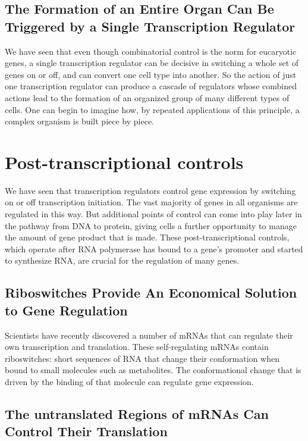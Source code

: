 \subsection{The Formation of an Entire Organ Can Be Triggered by a Single Transcription Regulator}

We have seen that even though combinatorial control is the norm for
eucaryotic genes, a single transcription regulator can be decisive in
switching a whole set of genes on or off, and can convert one cell type
into another. So the action of just one transcription regulator
can produce a cascade of regulators whose combined actions lead
to the formation of an organized group of many different types of cells.
One can begin to imagine how, by repeated applications of this principle,
a complex organism is built piece by piece.

\section{Post-transcriptional controls}

We have seen that transcription regulators control gene expression by
switching on or off transcription initiation. The vast majority of genes
in all organisms are regulated in this way. But additional points of control
can come into play later in the pathway from DNA to protein, giving
cells a further opportunity to manage the amount of gene product that
is made. These post-transcriptional controls, which operate after RNA
polymerase has bound to a gene’s promoter and started to synthesize
RNA, are crucial for the regulation of many genes.

\subsection{Riboswitches Provide An Economical Solution to Gene Regulation}

Scientists have recently discovered a number of mRNAs that can regulate their
own transcription and translation. These self-regulating mRNAs contain
riboswitches: short sequences of RNA that change their conformation
when bound to small molecules such as metabolites.
The conformational change that is driven by the binding of that molecule
can regulate gene expression.

\subsection{The untranslated Regions of mRNAs Can Control Their Translation}

